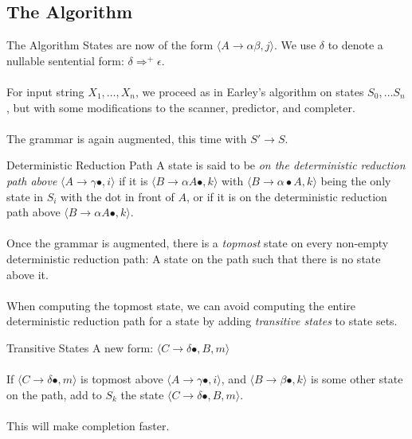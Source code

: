 \documentclass{beamer}
\begin{document}
\subsection{The Algorithm}
\begin{frame}{The Algorithm}
  States are now of the form $\langle A \to \alpha\beta, j \rangle$. We use $\delta$ to denote a nullable sentential form: $\delta \Rightarrow^+ \epsilon$.\\~\\

  For input string $X_1, \ldots, X_n$, we proceed as in Earley's algorithm on states $S_0, \ldots S_n$, but with some modifications to the scanner, predictor, and completer.\\~\\

  The grammar is again augmented, this time with $S' \to S$.
\end{frame}

\begin{frame}{Deterministic Reduction Path}
  A state is said to be {\it on the deterministic reduction path above} $\langle A \to \gamma \bullet, i \rangle$ if it is
  $\langle B \to \alpha A \bullet , k \rangle$ with $\langle B \to \alpha \bullet A, k \rangle$ being the only state in $S_i$
  with the dot in front of $A$, or if it is on the deterministic reduction path above $\langle B \to \alpha A \bullet , k \rangle$.
  \\~\\

  Once the grammar is augmented, there is a {\it topmost} state on every non-empty deterministic reduction path: A state on the path
  such that there is no state above it.\\~\\

  When computing the topmost state, we can avoid computing the entire deterministic reduction path for a state by adding {\it transitive states} to state sets.
\end{frame}

\begin{frame}{Transitive States}
  A new form: $\langle C \to \delta \bullet, B, m \rangle$\\~\\

  If $\langle C \to \delta \bullet, m \rangle$ is topmost above $\langle A \to \gamma \bullet, i \rangle$,
  and $\langle B \to \beta \bullet, k \rangle$ is some other state on the path, add to $S_k$ the state
  $\langle C \to \delta \bullet, B, m \rangle$.\\~\\

  This will make completion faster.
\end{frame}
\end{document}
